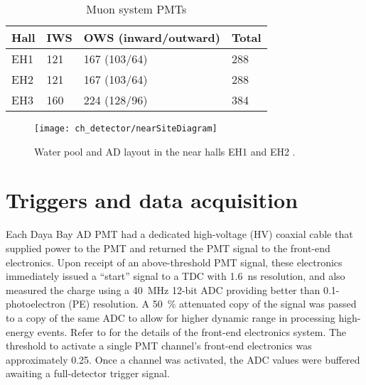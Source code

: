 \begin{table}[ht]
    \centering
    \begin{tabular}[t]{llll}
        \toprule
        Hall & IWS & OWS (inward/outward) & Total\\
        \midrule
        EH1 & 121 & 167 (103/64) & 288\\
        EH2 & 121 & 167 (103/64) & 288\\
        EH3 & 160 & 224 (128/96) & 384\\
        \bottomrule
    \end{tabular}
    \caption[Muon system PMTs]{Muon system PMTs \cite{muonsystem2015}}
    \label{tab:wp_pmts}
\end{table}

\begin{figure}
    \centering
    \texttt{[image: ch\_detector/nearSiteDiagram]}
    \caption[Water pool and AD layout]{
        Water pool and AD layout in the near halls EH1 and EH2
        \cite{sidebyside}.
    }
    \label{fig:wpcutout}
\end{figure}



\section{Triggers and data acquisition}
\label{sec:daq}

Each Daya Bay AD PMT had a dedicated high-voltage (HV) coaxial cable
that supplied power to the PMT and returned the PMT signal to the
front-end electronics.
Upon receipt of an above-threshold PMT signal, these electronics immediately
issued a ``start'' signal to a TDC with \SI{1.6}{\ns} resolution,
and also measured the charge using a \SI{40}{\MHz} \num{12}-bit ADC
providing better than \num{0.1}-photoelectron (PE) resolution.
A \SI{50}{\percent} attenuated copy of the signal was passed to a copy
of the same ADC to allow for higher dynamic range in processing high-energy
events.
Refer to \cite{sidebyside,ngd2016} for the details
of the front-end electronics system.
The threshold to activate a single PMT channel's front-end electronics
was approximately \SI{0.25}{\pe}.
Once a channel was activated, the ADC values were buffered
awaiting a full-detector trigger signal.

